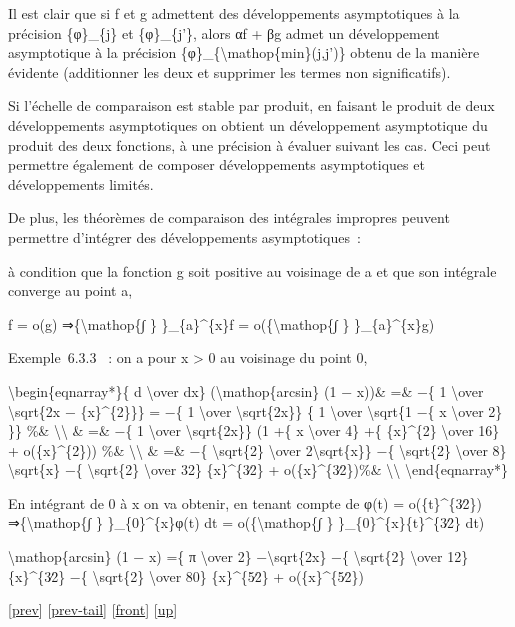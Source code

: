\documentclass[]{article}
\begin{document}
Il est clair que si f et g admettent des développements asymptotiques à
la précision \{φ\}\_\{j\} et \{φ\}\_\{j'\}, alors αf + βg admet un
développement asymptotique à la précision
\{φ\}\_\{\textbackslash{}mathop\{min\}(j,j')\} obtenu de la manière
évidente (additionner les deux et supprimer les termes non
significatifs).

Si l'échelle de comparaison est stable par produit, en faisant le
produit de deux développements asymptotiques on obtient un développement
asymptotique du produit des deux fonctions, à une précision à évaluer
suivant les cas. Ceci peut permettre également de composer
développements asymptotiques et développements limités.

De plus, les théorèmes de comparaison des intégrales impropres peuvent
permettre d'intégrer des développements asymptotiques~:

à condition que la fonction g soit positive au voisinage de a et que son
intégrale converge au point a,

f = o(g) ⇒\{\textbackslash{}mathop\{∫ \} \}\_\{a\}\^{}\{x\}f =
o(\{\textbackslash{}mathop\{∫ \} \}\_\{a\}\^{}\{x\}g)

Exemple~6.3.3 ~: on a pour x \textgreater{} 0 au voisinage du point 0,

\textbackslash{}begin\{eqnarray*\}\{ d \textbackslash{}over dx\}
(\textbackslash{}mathop\{arcsin\} (1 − x))\& =\& −\{ 1
\textbackslash{}over \textbackslash{}sqrt\{2x − \{x\}\^{}\{2\}\}\} = −\{
1 \textbackslash{}over \textbackslash{}sqrt\{2x\}\} \{ 1
\textbackslash{}over \textbackslash{}sqrt\{1 −\{ x \textbackslash{}over
2\} \}\} \%\& \textbackslash{}\textbackslash{} \& =\& −\{ 1
\textbackslash{}over \textbackslash{}sqrt\{2x\}\} (1 +\{ x
\textbackslash{}over 4\} +\{ \{x\}\^{}\{2\} \textbackslash{}over 16\} +
o(\{x\}\^{}\{2\})) \%\& \textbackslash{}\textbackslash{} \& =\& −\{
\textbackslash{}sqrt\{2\} \textbackslash{}over
2\textbackslash{}sqrt\{x\}\} −\{ \textbackslash{}sqrt\{2\}
\textbackslash{}over 8\} \textbackslash{}sqrt\{x\} −\{
\textbackslash{}sqrt\{2\} \textbackslash{}over 32\} \{x\}\^{}\{3∕2\} +
o(\{x\}\^{}\{3∕2\})\%\& \textbackslash{}\textbackslash{}
\textbackslash{}end\{eqnarray*\}

En intégrant de 0 à x on va obtenir, en tenant compte de φ(t) =
o(\{t\}\^{}\{3∕2\}) ⇒\{\textbackslash{}mathop\{∫ \}
\}\_\{0\}\^{}\{x\}φ(t) dt = o(\{\textbackslash{}mathop\{∫ \}
\}\_\{0\}\^{}\{x\}\{t\}\^{}\{3∕2\} dt)

\textbackslash{}mathop\{arcsin\} (1 − x) =\{ π \textbackslash{}over 2\}
−\textbackslash{}sqrt\{2x\} −\{ \textbackslash{}sqrt\{2\}
\textbackslash{}over 12\} \{x\}\^{}\{3∕2\} −\{ \textbackslash{}sqrt\{2\}
\textbackslash{}over 80\} \{x\}\^{}\{5∕2\} + o(\{x\}\^{}\{5∕2\})

{[}\href{coursse33.html}{prev}{]}
{[}\href{coursse33.html\#tailcoursse33.html}{prev-tail}{]}
{[}\href{coursse34.html}{front}{]}
{[}\href{coursch7.html\#coursse34.html}{up}{]}
\end{document}
